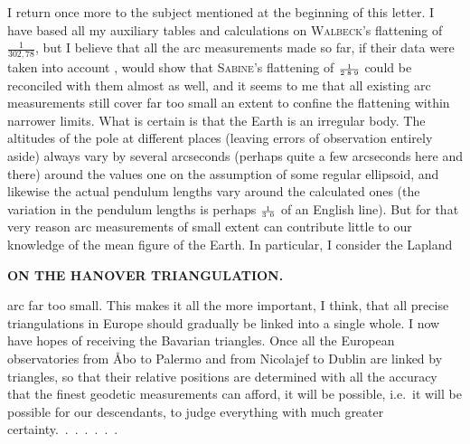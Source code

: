\par\noindent\hspace*{\parindent}I return once more to the subject mentioned at the beginning of this letter.
I have based all my auxiliary tables and calculations on \textsc{Walbeck}'s flattening of \(\frac{1}{302{,}78}\), but I believe that all the arc measurements made so far, if their data were taken into account , would show that \textsc{Sabine}'s flattening of \(\scriptstyle\frac{1}{2\mkern5mu 8\mkern5mu 9}\) could be reconciled with them almost as well, and it seems to me that all existing arc measurements still cover far too small an extent to confine the flattening within narrower limits.
What is certain is that the Earth is an irregular body. The altitudes of the pole at different places (leaving errors of observation entirely aside) always vary by several arcseconds (perhaps quite a few arcseconds here and there) around the values one  on the assumption of some regular ellipsoid, and likewise the actual pendulum lengths vary around the calculated ones (the  variation in the pendulum lengths is perhaps \(\scriptstyle\frac{1}{3\mkern7mu 0}\) of an English line).
But for that very reason arc measurements of small extent can contribute little to our knowledge of the mean figure of the Earth. In particular, I consider the Lapland
\par\clearpage
\noindent\null\hfill{\small\textbf{ON THE HANOVER TRIANGULATION.}}\hfill{}\par\medskip
\noindent arc far too small.
This makes it all the more important, I think, that all precise triangulations in Europe should gradually be linked into a single whole.
I now have hopes of receiving the Bavarian triangles.
Once all the European observatories from Åbo to Palermo and from Nicolajef to Dublin are linked by triangles, so that their relative positions are determined with all the accuracy that the finest geodetic measurements can afford, it will be possible, i.e.\ it will be possible for our descendants, to judge everything with much greater \mbox{certainty.\ .\ .\ .\ .\ .\ .}

